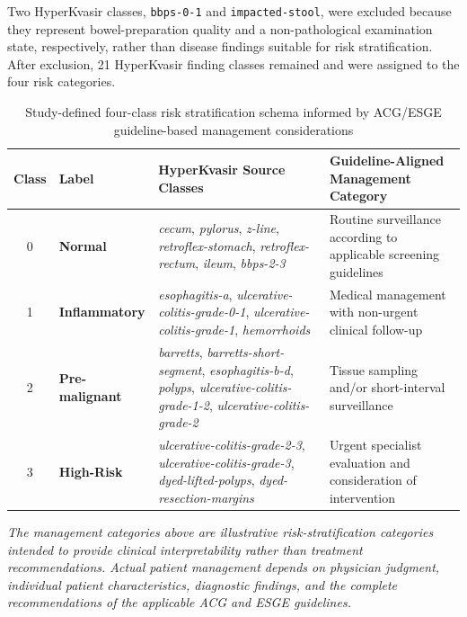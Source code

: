 \documentclass[11pt,a4paper]{article}
\begin{document}
Two HyperKvasir classes, \texttt{bbps-0-1} and \texttt{impacted-stool},
were excluded because they represent bowel-preparation quality and a
non-pathological examination state, respectively, rather than disease findings
suitable for risk stratification. After exclusion, 21 HyperKvasir
finding classes remained and were assigned to the four risk categories.

\begin{table}[H]
\centering
\caption{Study-defined four-class risk stratification schema informed by
  ACG/ESGE guideline-based management considerations}
\label{tab:schema}
\begin{tabular}{clp{5.8cm}p{3.8cm}}
\toprule
\textbf{Class} & \textbf{Label} &
\textbf{HyperKvasir Source Classes} &
\textbf{Guideline-Aligned Management Category}\\
\midrule
0 & \textbf{Normal} &
  \raggedright\textit{cecum}, \textit{pylorus}, \textit{z-line},
  \textit{retroflex-stomach}, \textit{retroflex-rectum},
  \textit{ileum}, \textit{bbps-2-3}\arraybackslash &
  Routine surveillance according to applicable screening guidelines\\[2pt]
1 & \textbf{Inflammatory} &
  \raggedright\textit{esophagitis-a},
  \textit{ulcerative-colitis-grade-0-1},
  \textit{ulcerative-colitis-grade-1},
  \textit{hemorrhoids}\arraybackslash &
  Medical management with non-urgent clinical follow-up\\[2pt]
2 & \textbf{Pre-malignant} &
  \raggedright\textit{barretts}, \textit{barretts-short-segment},
  \textit{esophagitis-b-d}, \textit{polyps},
  \textit{ulcerative-colitis-grade-1-2},
  \textit{ulcerative-colitis-grade-2}\arraybackslash &
  Tissue sampling and/or short-interval surveillance\\[2pt]
3 & \textbf{High-Risk} &
  \raggedright\textit{ulcerative-colitis-grade-2-3},
  \textit{ulcerative-colitis-grade-3},
  \textit{dyed-lifted-polyps},
  \textit{dyed-resection-margins}\arraybackslash &
  Urgent specialist evaluation and consideration of intervention\\
\bottomrule
\end{tabular}
\par\smallskip
{\footnotesize\textit{The management categories above are illustrative
risk-stratification categories intended to provide clinical interpretability
rather than treatment recommendations. Actual patient management depends on
physician judgment, individual patient characteristics, diagnostic findings,
and the complete recommendations of the applicable ACG and ESGE guidelines.}}
\end{table}
\end{document}
